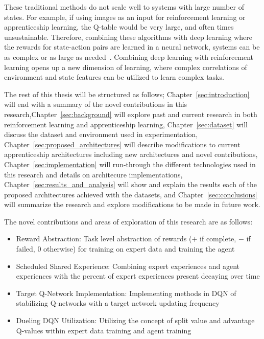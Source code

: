 \documentclass[12pt,american]{report}
\begin{document}
These traditional methods do not scale well to systems with large number of states.  For example, if using images as an input for reinforcement learning or apprenticeship learning, the Q-table would be very large, and often times unsustainable.  Therefore, combining these algorithms with deep learning where the rewards for state-action pairs are learned in a neural network, systems can be as complex or as large as needed~\cite{matiisen_2015}. Combining deep learning with reinforcement learning opens up a new dimension of learning, where complex correlations of environment and state features can be utilized to learn complex tasks.

The rest of this thesis will be structured as follows; Chapter~\ref{sec:introduction} will end with a summary of the novel contributions in this research,Chapter~\ref{sec:background} will explore past and current research in both reinforcement learning and apprenticeship learning, Chapter~\ref{sec:dataset} will discuss the dataset and environment used in experimentation, Chapter~\ref{sec:proposed_architectures} will describe modifications to current apprenticeship architectures including new architectures and novel contributions, Chapter~\ref{sec:implementation} will run-through the different technologies used in this research and details on architecure implementations, Chapter~\ref{sec:results_and_analysis} will show and explain the results each of the proposed architectures achieved with the datasets, and Chapter~\ref{sec:conclusions} will summarize the research and explore modifications to be made in future work.

The novel contributions and areas of exploration of this research are as follows:
\begin{itemize}
  \item Reward Abstraction: Task level abstraction of rewards ($+$ if complete, $-$ if failed, $0$ otherwise) for training on expert data and training the agent
  \item Scheduled Shared Experience: Combining expert experiences and agent experiences with the percent of expert experiences present decaying over time
  \item Target Q-Network Implementation: Implementing methods in DQN of stabilizing Q-networks with a target network updating frequency
  \item Dueling DQN Utilization: Utilizing the concept of split value and advantage Q-values within expert data training and agent training
\end{itemize}
\end{document}
